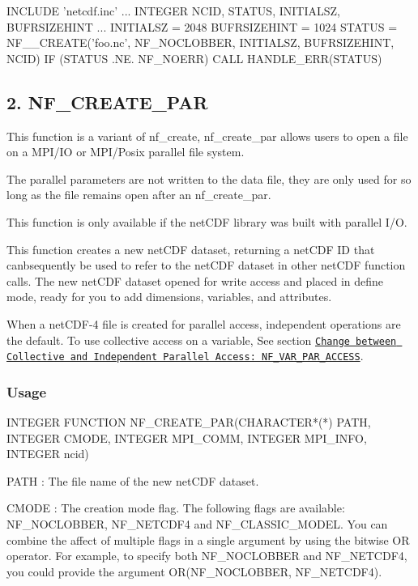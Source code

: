 \begin{DoxyCode}
INCLUDE 'netcdf.inc'
  ...
INTEGER NCID, STATUS, INITIALSZ, BUFRSIZEHINT
...
INITIALSZ = 2048
BUFRSIZEHINT = 1024
STATUS = NF\_\_CREATE('foo.nc', NF\_NOCLOBBER, INITIALSZ, BUFRSIZEHINT, NCID)
IF (STATUS .NE. NF\_NOERR) CALL HANDLE\_ERR(STATUS)
\end{DoxyCode}
\hypertarget{nc_f77_interface_guide_f77_NF_CREATE_PAR}{}\subsection{2. N\+F\+\_\+\+C\+R\+E\+A\+T\+E\+\_\+\+P\+A\+R }\label{nc_f77_interface_guide_f77_NF_CREATE_PAR}
This function is a variant of nf\+\_\+create, nf\+\_\+create\+\_\+par allows users to open a file on a M\+P\+I/\+IO or M\+P\+I/\+Posix parallel file system.

The parallel parameters are not written to the data file, they are only used for so long as the file remains open after an nf\+\_\+create\+\_\+par.

This function is only available if the net\+C\+DF library was built with parallel I/O.

This function creates a new net\+C\+DF dataset, returning a net\+C\+DF ID that canbsequently be used to refer to the net\+C\+DF dataset in other net\+C\+DF function calls. The new net\+C\+DF dataset opened for write access and placed in define mode, ready for you to add dimensions, variables, and attributes.

When a net\+C\+D\+F-\/4 file is created for parallel access, independent operations are the default. To use collective access on a variable, See section \href{#NF_005fVAR_005fPAR_005fACCESS}{\tt Change between Collective and Independent Parallel Access\+: N\+F\+\_\+\+V\+A\+R\+\_\+\+P\+A\+R\+\_\+\+A\+C\+C\+E\+SS}.

\subsubsection*{Usage}


\begin{DoxyCode}
INTEGER FUNCTION NF\_CREATE\_PAR(CHARACTER*(*) PATH, INTEGER CMODE,
                               INTEGER MPI\_COMM, INTEGER MPI\_INFO,
                               INTEGER ncid)
\end{DoxyCode}


{\ttfamily P\+A\+TH} \+: The file name of the new net\+C\+DF dataset.

{\ttfamily C\+M\+O\+DE} \+: The creation mode flag. The following flags are available\+: N\+F\+\_\+\+N\+O\+C\+L\+O\+B\+B\+ER, N\+F\+\_\+\+N\+E\+T\+C\+D\+F4 and N\+F\+\_\+\+C\+L\+A\+S\+S\+I\+C\+\_\+\+M\+O\+D\+EL. You can combine the affect of multiple flags in a single argument by using the bitwise OR operator. For example, to specify both N\+F\+\_\+\+N\+O\+C\+L\+O\+B\+B\+ER and N\+F\+\_\+\+N\+E\+T\+C\+D\+F4, you could provide the argument OR(N\+F\+\_\+\+N\+O\+C\+L\+O\+B\+B\+ER, N\+F\+\_\+\+N\+E\+T\+C\+D\+F4).

